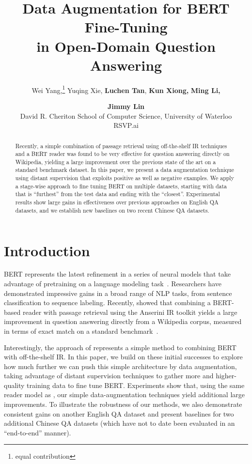 \documentclass[11pt,a4paper]{article}
\title{Data Augmentation for BERT Fine-Tuning\\ in Open-Domain Question Answering}
\author{Wei Yang,\thanks{\hspace{0.25cm}equal contribution}\hspace{0.2cm} Yuqing Xie,\samethanks\hspace{0.2cm} {\bf Luchen Tan},
{\bf Kun Xiong,} {\bf Ming Li,} \and {\bf Jimmy Lin}\vspace{0.1cm}\\
 David R. Cheriton School of Computer Science, University of Waterloo \\
 RSVP.ai}
\date{}
\begin{document}
\maketitle

\begin{abstract}
Recently, a simple combination of passage retrieval using off-the-shelf IR techniques and a BERT reader was found to be very effective for question answering directly on Wikipedia, yielding a large improvement over the previous state of the art on a standard benchmark dataset.
In this paper, we present a data augmentation technique using distant supervision that exploits positive as well as negative examples.
We apply a stage-wise approach to fine tuning BERT on multiple datasets, starting with data that is ``furthest'' from the test data and ending with the ``closest''.
Experimental results show large gains in effectiveness over previous approaches on English QA datasets, and we establish new baselines on two recent Chinese QA datasets.
\end{abstract}

\section{Introduction}

BERT \cite{devlin2018bert} represents the latest refinement in a series of neural models that take advantage of pretraining on a language modeling task~\cite{N18-1202,radford2018improving}.
Researchers have demonstrated impressive gains in a broad range of NLP tasks, from sentence classification to sequence labeling.
Recently, \citet{yang2019end} showed that combining a BERT-based reader with passage retrieval using the Anserini IR toolkit yields a large improvement in question answering directly from a Wikipedia corpus, measured in terms of exact match on a standard benchmark~\cite{P17-1171}.

Interestingly, the approach of \citet{yang2019end} represents a simple method to combining BERT with off-the-shelf IR.
In this paper, we build on these initial successes to explore how much further we can push this simple architecture by data augmentation, taking advantage of distant supervision techniques to gather more and higher-quality training data to fine tune BERT.
Experiments show that, using the same reader model as \citet{yang2019end}, our simple data-augmentation techniques yield additional large improvements.
To illustrate the robustness of our methods, we also demonstrate consistent gains on another English QA dataset and present baselines for two additional Chinese QA datasets (which have not to date been evaluated in an ``end-to-end'' manner).
\end{document}
